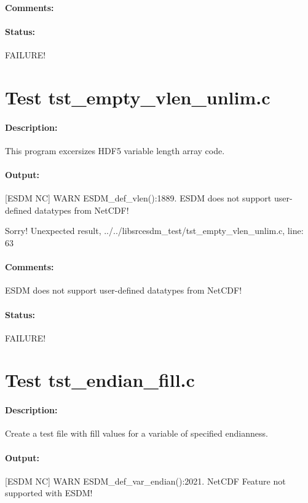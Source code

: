\paragraph{Comments:} {\color{blue}{Help, Julian!}}

\paragraph{Status:} FAILURE!

\section{Test tst\_empty\_vlen\_unlim.c}

\paragraph{Description:} This program excersizes HDF5 variable length array code.

\paragraph{Output:} [ESDM NC] WARN ESDM\_def\_vlen():1889. ESDM does not support user-defined datatypes from NetCDF!

Sorry! Unexpected result, ../../libsrcesdm\_test/tst\_empty\_vlen\_unlim.c, line: 63

\paragraph{Comments:} ESDM does not support user-defined datatypes from NetCDF!

\paragraph{Status:} FAILURE!

\section{Test tst\_endian\_fill.c}

\paragraph{Description:} Create a test file with fill values for a variable of specified endianness.

\paragraph{Output:} [ESDM NC] WARN ESDM\_def\_var\_endian():2021. NetCDF Feature not supported with ESDM!

